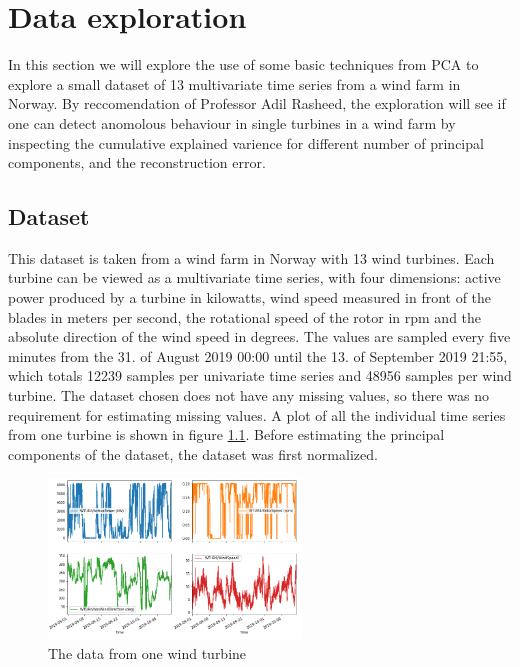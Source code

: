 \chapter{Data exploration} \label{chap:data_exp}

In this section we will explore the use of some basic techniques from PCA to explore a small dataset of 13 multivariate time series from a wind farm in Norway.  
By reccomendation of Professor Adil Rasheed, the exploration will see if one can detect anomolous behaviour in single turbines in a wind farm by inspecting the cumulative explained varience for different number of principal components, and the reconstruction error.

\section{Dataset}

This dataset is taken from a wind farm in Norway with 13 wind turbines. 
Each turbine can be viewed as a multivariate time series, with four dimensions: active power produced by a turbine in kilowatts, wind speed measured in front of the blades in meters per second, the rotational speed of the rotor in rpm and the absolute direction of the wind speed in degrees. 
The values are sampled every five minutes from the 31. of August 2019 00:00 until the 13. of September 2019 21:55, which totals 12239 samples per univariate time series and 48956 samples per wind turbine. 
The dataset chosen does not have any missing values, so there was no requirement for estimating missing values. 
A plot of all the individual time series from one turbine is shown in figure \ref{fig:data_one_wt}.
Before estimating the principal components of the dataset, the dataset was first normalized. \bigskip

\begin{figure}
    \begin{center}
    \includegraphics[width=0.6\textwidth]{data_exp/one_turbine_all_vals}
    \end{center}
    \caption{The data from one wind turbine} 
    \label{fig:data_one_wt}
\end{figure}

